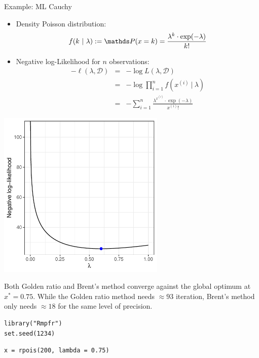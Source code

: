 \begin{vbframe}{Example: ML Cauchy}
\begin{itemize}
\item Density Poisson distribution:
$$
f(k ~|~ \lambda) := \P(x = k) = \frac{\lambda^k \cdot \exp(-\lambda)}{k!}
$$
\item Negative log-Likelihood for $n$ observations:
\begin{eqnarray*}
- \ell(\lambda, \mathcal{D}) &=& - \log L(\lambda, \mathcal{D}) \\ &=& - \log \prod_{i = 1}^n  f\left(x^{(i)} ~|~ \lambda\right) \\ &=&  - \sum_{i = 1}^n \frac{\lambda^{x^{(i)} } \cdot \exp(-\lambda)}{x^{(i)} !} 
\end{eqnarray*}

\end{itemize}

\framebreak 

\begin{center}
	\includegraphics[width = 0.6\textwidth]{figure_man/poisson.pdf}
\end{center}

\framebreak 

Both Golden ratio and Brent's method converge against the global optimum at $x^\ast = 0.75$. While the Golden ratio method needs $\approx 93$ iteration, Brent's method only needs $\approx 18$ for the same level of precision. 

\lz
\footnotesize
\begin{verbatim}
library("Rmpfr")
set.seed(1234)
\end{verbatim}

\vspace{0.2cm}

\begin{verbatim}
x = rpois(200, lambda = 0.75)


\end{verbatim}
\end{vbframe}
